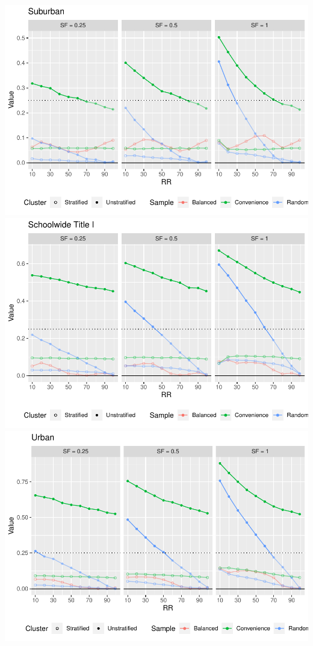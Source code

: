 \documentclass[
  man,floatsintext]{apa6}
\begin{document}
\includegraphics{5---Analysis_files/figure-latex/unnamed-chunk-20-1.pdf} \includegraphics{5---Analysis_files/figure-latex/unnamed-chunk-20-2.pdf} \includegraphics{5---Analysis_files/figure-latex/unnamed-chunk-20-3.pdf}
\end{document}

